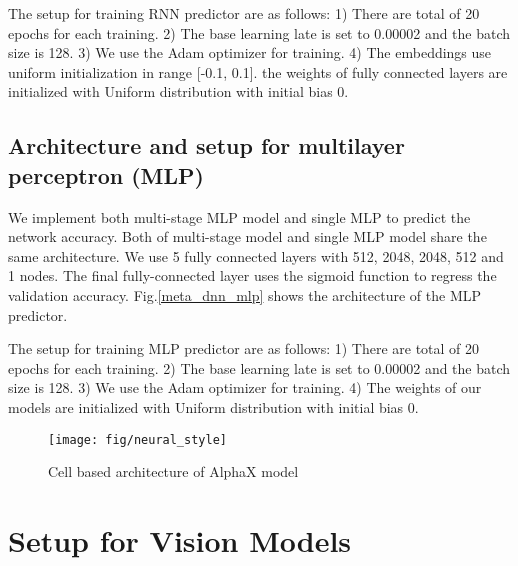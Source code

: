 \documentclass[10pt,twocolumn,letterpaper]{article}
\begin{document}
The setup for training RNN predictor are as follows: 1) There are total of 20 epochs for each training. 2) The base learning late is set to 0.00002 and the batch size is 128. 3) We use the Adam optimizer for training. 4) The embeddings use uniform initialization in range [-0.1, 0.1]. the weights of fully connected layers are initialized with Uniform distribution with initial bias 0.

\subsection{Architecture and setup for multilayer perceptron (MLP)}

We implement both multi-stage MLP model and single MLP to predict the network accuracy. Both of multi-stage model and single MLP model share the same architecture. We use 5 fully connected layers with 512, 2048, 2048, 512 and 1 nodes. The final fully-connected layer uses the sigmoid function to regress the validation accuracy. Fig.\ref{meta_dnn_mlp} shows the architecture of the MLP predictor. 

The setup for training MLP predictor are as follows: 1) There are total of 20 epochs for each training. 2) The base learning late is set to 0.00002 and the batch size is 128. 3) We use the Adam optimizer for training.
4) The weights of our models are initialized with Uniform distribution with initial bias 0.


\begin{figure}[t]
\centering 
\texttt{[image: fig/neural\_style]}
\caption{Cell based architecture of AlphaX model}
\label{neural_style}
\end{figure}

\section{Setup for Vision Models}
\end{document}
